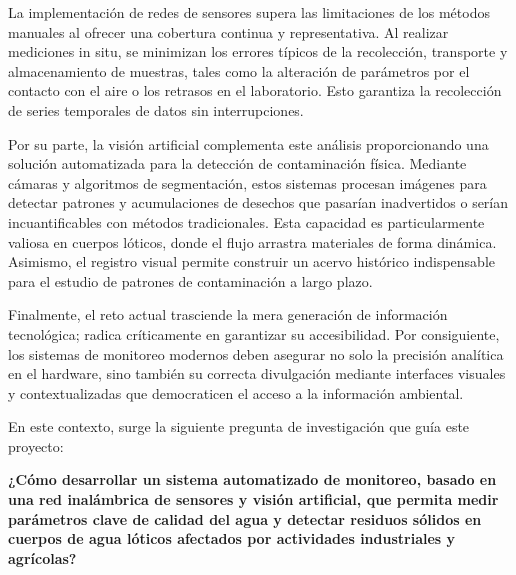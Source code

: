 La implementación de redes de sensores supera las limitaciones de los métodos manuales al ofrecer una cobertura continua y representativa. Al realizar mediciones in situ, se minimizan los errores típicos de la recolección, transporte y almacenamiento de muestras, tales como la alteración de parámetros por el contacto con el aire o los retrasos en el laboratorio. Esto garantiza la recolección de series temporales de datos sin interrupciones.

Por su parte, la visión artificial complementa este análisis proporcionando una solución automatizada para la detección de contaminación física. Mediante cámaras y algoritmos de segmentación, estos sistemas procesan imágenes para detectar patrones y acumulaciones de desechos que pasarían inadvertidos o serían incuantificables con métodos tradicionales. Esta capacidad es particularmente valiosa en cuerpos lóticos, donde el flujo arrastra materiales de forma dinámica. Asimismo, el registro visual permite construir un acervo histórico indispensable para el estudio de patrones de contaminación a largo plazo.

Finalmente, el reto actual trasciende la mera generación de información tecnológica; radica críticamente en garantizar su accesibilidad. Por consiguiente, los sistemas de monitoreo modernos deben asegurar no solo la precisión analítica en el hardware, sino también su correcta divulgación mediante interfaces visuales y contextualizadas que democraticen el acceso a la información ambiental.

En este contexto, surge la siguiente pregunta de investigación que guía este proyecto:

\vspace{0.3cm}
\begin{center}
  \textbf{¿Cómo desarrollar un sistema automatizado de monitoreo, basado en una red inalámbrica de sensores y visión artificial, que permita medir parámetros clave de calidad del agua y detectar residuos sólidos en cuerpos de agua lóticos afectados por actividades industriales y agrícolas?}
\end{center}
\vspace{0.3cm}